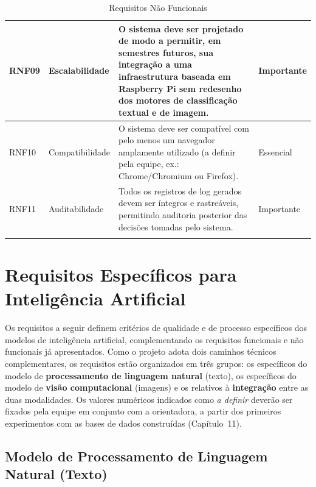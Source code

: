 \documentclass[
    12pt,           %
    oneside,        %
    a4paper,        %
    chapter=TITLE,  %
    english,        %
    brazil          %
]{abntex2}
\begin{document}
\begin{longtable}{|p{1.5cm}|p{3.2cm}|p{6.8cm}|p{2.2cm}|}
RNF09 & Escalabilidade & O sistema deve ser projetado de modo a permitir, em semestres futuros, sua integração a uma infraestrutura baseada em Raspberry Pi sem redesenho dos motores de classificação textual e de imagem. & Importante \\ \hline
RNF10 & Compatibilidade & O sistema deve ser compatível com pelo menos um navegador amplamente utilizado (a definir pela equipe, ex.: Chrome/Chromium ou Firefox). & Essencial \\ \hline
RNF11 & Auditabilidade & Todos os registros de log gerados devem ser íntegros e rastreáveis, permitindo auditoria posterior das decisões tomadas pelo sistema. & Importante \\ \hline

\caption{Requisitos Não Funcionais}
\label{tab:requisitos-nao-funcionais}
\end{longtable}

\section{Requisitos Específicos para Inteligência Artificial}

Os requisitos a seguir definem critérios de qualidade e de processo
específicos dos modelos de inteligência artificial, complementando os
requisitos funcionais e não funcionais já apresentados. Como o projeto adota
dois caminhos técnicos complementares, os requisitos estão organizados em
três grupos: os específicos do modelo de \textbf{processamento de linguagem
natural} (texto), os específicos do modelo de \textbf{visão computacional}
(imagens) e os relativos à \textbf{integração} entre as duas modalidades. Os
valores numéricos indicados como \textit{a definir} deverão ser fixados pela
equipe em conjunto com a orientadora, a partir dos primeiros experimentos com
as bases de dados construídas (Capítulo~11).

\subsection{Modelo de Processamento de Linguagem Natural (Texto)}
\end{document}
